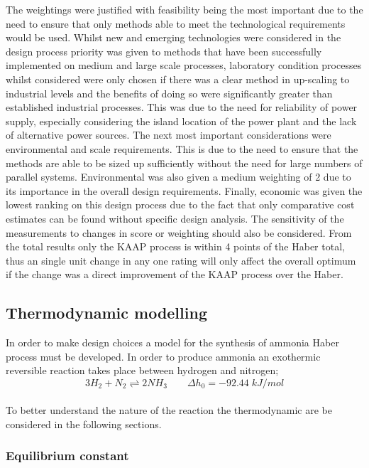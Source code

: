 \documentclass[11pt, a4paper]{article}
\begin{document}
{The weightings were justified with feasibility being the most important due to the need to ensure that only methods able to meet the technological requirements would be used. Whilst new and emerging technologies were considered in the design process priority was given to methods that have been successfully implemented on medium and large scale processes, laboratory condition processes whilst considered were only chosen if there was a clear method in up-scaling to industrial levels and the benefits of doing so were significantly greater than established industrial processes. This was due to the need for reliability of power supply, especially considering the island location of the power plant and the lack of alternative power sources. The next most important considerations were environmental and scale requirements. This is due to the need to ensure that the methods are able to be sized up sufficiently without the need for large numbers of parallel systems. Environmental was also given a medium weighting of 2 due to its importance in the overall design requirements. Finally, economic was given the lowest ranking on this design process due to the fact that only comparative cost estimates can be found without specific design analysis. The sensitivity of the measurements to changes in score or weighting should also be considered. From the total results only the KAAP process is within 4 points of the Haber total, thus an single unit change in any one rating will only affect the overall optimum if the change was a direct improvement of the KAAP process over the Haber.

\subsection{Thermodynamic modelling}
In order to make design choices a model for the synthesis of ammonia Haber process must be developed. In order to produce ammonia an exothermic reversible reaction takes place between hydrogen and nitrogen;
\begin{equation}
3H_2+N_2   \underset{ }{\stackrel{ }{\rightleftharpoons}}   2NH_3 \qquad \Delta h_0 = -92.44 \; kJ/mol 
\end{equation}

To better understand the nature of the reaction the thermodynamic are be considered in the following sections.


\subsubsection{Equilibrium constant}

}
\end{document}
